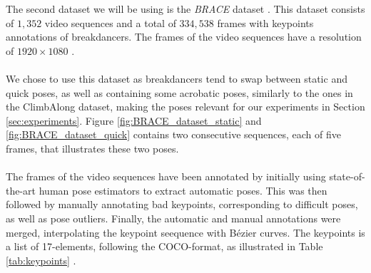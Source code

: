 \documentclass[./main.tex]{subfiles}
\begin{document}
\noindent The second dataset we will be using is the \textit{BRACE} dataset \cite{BRACE}. This dataset consists of $1,352$ video sequences and a total of $334,538$ frames with keypoints annotations of breakdancers. The frames of the video sequences have a resolution of $1920 \times 1080$ \cite{BRACE}.
\\
\\
We chose to use this dataset as breakdancers tend to swap between static and quick poses, as well as containing some acrobatic poses, similarly to the ones in the ClimbAlong dataset, making the poses relevant for our experiments in Section \ref{sec:experiments}. Figure \ref{fig:BRACE_dataset_static} and \ref{fig:BRACE_dataset_quick} contains two consecutive sequences, each of five frames, that illustrates these two poses.
\\
\\
The frames of the video sequences have been annotated by initially using state-of-the-art human pose estimators to extract automatic poses. This was then followed by manually annotating bad keypoints, corresponding to difficult poses, as well as pose outliers. Finally, the automatic and manual annotations were merged, interpolating the keypoint seequence with Bézier curves. The keypoints is a list of 17-elements, following the COCO-format, as illustrated in Table \ref{tab:keypoints} \cite{BRACE}.
\end{document}
